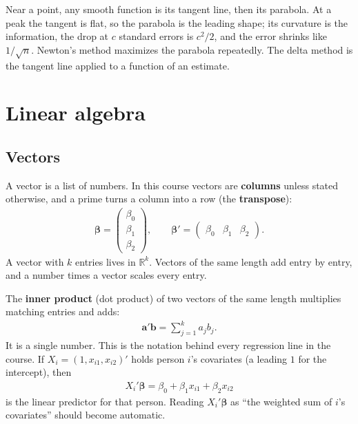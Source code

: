 \documentclass[11pt]{article}
\theoremstyle{definition}
\newcommand{\R}{\mathbb{R}}
\newcommand{\bbeta}{\bm{\beta}}
\begin{document}
\begin{takeaway}
Near a point, any smooth function is its tangent line, then its parabola.
At a peak the tangent is flat, so the parabola is the leading shape; its
curvature is the information, the drop at $c$ standard errors is $c^2/2$,
and the error shrinks like $1/\sqrt n$. Newton's method maximizes the
parabola repeatedly. The delta method is the tangent line applied to a
function of an estimate.
\end{takeaway}

\section{Linear algebra}
\label{sec:linalg}

\subsection{Vectors}

A vector is a list of numbers. In this course vectors are \textbf{columns}
unless stated otherwise, and a prime turns a column into a row (the
\textbf{transpose}):
\begin{align*}
  \bbeta = \begin{pmatrix}\beta_0\\ \beta_1\\ \beta_2\end{pmatrix},
  \qquad
  \bbeta' = \begin{pmatrix}\beta_0 & \beta_1 & \beta_2\end{pmatrix}.
\end{align*}
A vector with $k$ entries lives in $\R^k$. Vectors of the same length add
entry by entry, and a number times a vector scales every entry.

The \textbf{inner product} (dot product) of two vectors of the same length
multiplies matching entries and adds:
\begin{align*}
  \bm a'\bm b = \sum_{j=1}^{k} a_j b_j .
\end{align*}
It is a single number. This is the notation behind every regression line in
the course. If $X_i = (1, x_{i1}, x_{i2})'$ holds person $i$'s covariates
(a leading $1$ for the intercept), then
\begin{align*}
  X_i'\bbeta = \beta_0 + \beta_1 x_{i1} + \beta_2 x_{i2}
\end{align*}
is the linear predictor for that person. Reading $X_i'\bbeta$ as
``the weighted sum of $i$'s covariates'' should become automatic.
\end{document}
